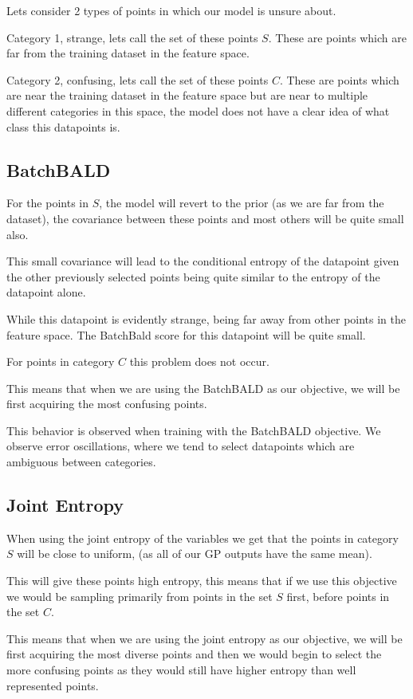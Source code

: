 \documentclass[12pt, a4paper]{report}
\theoremstyle{definition}
\theoremstyle{definition}
\theoremstyle{definition}
\begin{document}
Lets consider 2 types of points in which our model is unsure about.

Category 1, strange, lets call the set of these points $S$. These are points which are far from the training dataset in the feature space.

Category 2, confusing, lets call the set of these points $C$. These are points which are near the training dataset in the feature space but are near to multiple different categories in this space, the model does not have a clear idea of what class this datapoints is.



\subsection{BatchBALD}
For the points in $S$, the model will revert to the prior (as we are far from the dataset), the covariance between these points and most others will be quite small also.

This small covariance will lead to the conditional entropy of the datapoint given the other previously selected points being quite similar to the entropy of the datapoint alone.

While this datapoint is evidently strange, being far away from other points in the feature space. The BatchBald score for this datapoint will be quite small.

For points in category $C$ this problem does not occur.

This means that when we are using the BatchBALD as our objective, we will be first acquiring the most confusing points.


This behavior is observed when training with the BatchBALD objective. We observe error oscillations, where we tend to select datapoints which are ambiguous between categories.

\subsection{Joint Entropy}
When using the joint entropy of the variables we get that the points in category $S$ will be close to uniform, (as all of our GP outputs have the same mean).

This will give these points high entropy, this means that if we use this objective we would be sampling primarily from points in the set $S$ first, before points in the set $C$.

This means that when we are using the joint entropy as our objective, we will be first acquiring the most diverse points and then we would begin to select the more confusing points as they would still have higher entropy than well represented points.
\end{document}
